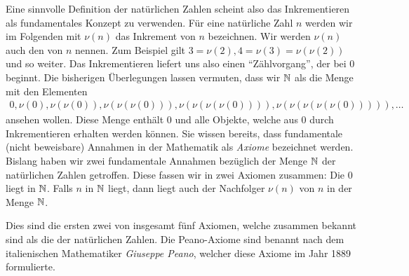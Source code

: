 Eine sinnvolle Definition der natürlichen Zahlen scheint also das Inkrementieren als fundamentales Konzept zu verwenden. Für eine natürliche Zahl $n$ werden wir im Folgenden mit $\nu(n)$ das Inkrement von $n$ bezeichnen. Wir werden $\nu(n)$ auch den  von $n$ nennen. Zum Beispiel gilt $3=\nu(2), 4 = \nu(3) = \nu(\nu(2))$ und so weiter. Das Inkrementieren liefert uns also einen \enquote{Zählvorgang}, der bei 0 beginnt. Die bisherigen Überlegungen lassen vermuten, dass wir $\mathbb{N}$ als die Menge mit den Elementen
\begin{align*}
    0, \nu(0), \nu(\nu(0)), \nu(\nu(\nu(0))), \nu(\nu(\nu(\nu(0)))), \nu(\nu(\nu(\nu(\nu(0))))), \ldots
\end{align*}
ansehen wollen. Diese Menge enthält $0$ und alle Objekte, welche aus $0$ durch Inkrementieren erhalten werden können. Sie wissen bereits, dass fundamentale (nicht beweisbare) Annahmen in der Mathematik als \textit{Axiome} bezeichnet werden. Bislang haben wir zwei fundamentale Annahmen bezüglich der Menge $\mathbb{N}$ der natürlichen Zahlen getroffen. Diese fassen wir in zwei Axiomen zusammen:
{Die $0$ liegt in $\mathbb{N}$.}
{Falls $n$ in $\mathbb{N}$ liegt, dann liegt auch der Nachfolger $\nu(n)$ von $n$ in der Menge $\mathbb{N}$.}

\noindent
Dies sind die ersten zwei von insgesamt fünf Axiomen, welche zusammen bekannt sind als die  der natürlichen Zahlen. Die Peano-Axiome sind benannt nach dem italienischen Mathematiker \textit{Giuseppe Peano}, welcher diese Axiome im Jahr 1889 formulierte.

